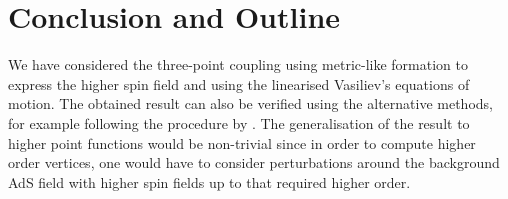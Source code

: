\documentclass[prd,superscriptaddress,twocolumn,10pt]{revtex4}
\begin{document}
\section{Conclusion and Outline}
We have considered the three-point coupling using metric-like formation to express the higher spin field and using the linearised Vasiliev's equations of motion.  The obtained result can also be verified using the alternative methods, for example following the procedure by . 
The generalisation of the result to higher point functions would be non-trivial since in order to compute higher order vertices, one would have to consider perturbations around the background AdS field with higher spin fields up to that required higher order. 
\end{document}
